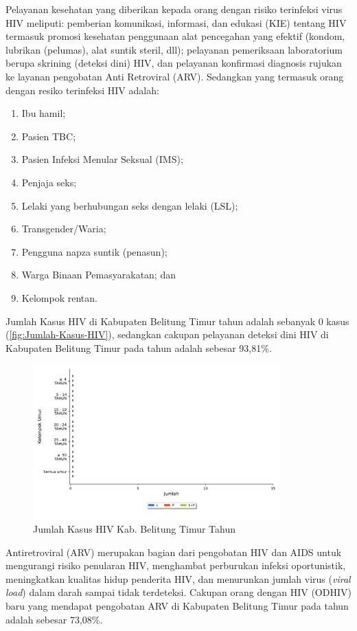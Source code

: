 Pelayanan kesehatan yang diberikan kepada orang dengan risiko terinfeksi virus HIV meliputi: pemberian komunikasi, informasi, dan edukasi (KIE) tentang HIV termasuk promosi kesehatan penggunaan alat pencegahan yang efektif (kondom, lubrikan (pelumas), alat suntik steril, dll); pelayanan pemeriksaan laboratorium berupa skrining (deteksi dini) HIV, dan pelayanan konfirmasi diagnosis rujukan ke layanan pengobatan Anti Retroviral (ARV). Sedangkan yang termasuk orang dengan resiko terinfeksi HIV adalah:
\begin{enumerate}
  \item Ibu hamil;
  \item Pasien TBC;
  \item Pasien Infeksi Menular Seksual (IMS);
  \item Penjaja seks;
  \item Lelaki yang berhubungan seks dengan lelaki (LSL);
  \item Transgender/Waria;
  \item Pengguna napza suntik (penasun);
  \item Warga Binaan Pemasyarakatan; dan
  \item Kelompok rentan.
\end{enumerate}

Jumlah Kasus HIV di Kabupaten Belitung Timur tahun \tP adalah sebanyak 0 kasus (\autoref{fig:Jumlah-Kasus-HIV}), sedangkan cakupan pelayanan deteksi dini HIV di Kabupaten Belitung Timur pada tahun \tP adalah sebesar 93,81\%.

\begin{figure}[H]
  \centering
  \includegraphics[width=0.85\textwidth]{bab_06/bab_06_03a_HIV}
  \caption{Jumlah Kasus HIV Kab. Belitung Timur Tahun \tP}
  \label{fig:Jumlah-Kasus-HIV}
\end{figure}

Antiretroviral (ARV) merupakan bagian dari pengobatan HIV dan AIDS untuk mengurangi risiko penularan HIV, menghambat perburukan infeksi oportunistik, meningkatkan kualitas hidup penderita HIV, dan menurunkan jumlah virus (\emph{viral load}) dalam darah sampai tidak terdeteksi. Cakupan orang dengan HIV (ODHIV) baru yang mendapat pengobatan ARV di Kabupaten Belitung Timur pada tahun \tP adalah sebesar 73,08\%.

